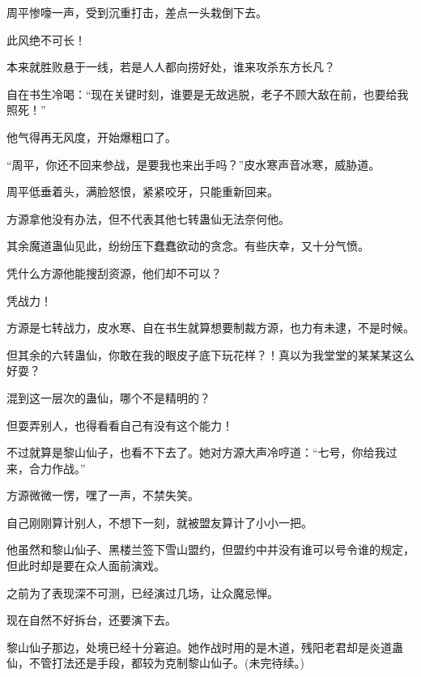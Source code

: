 \begin{this_body}
周平惨嚎一声，受到沉重打击，差点一头栽倒下去。

此风绝不可长！

本来就胜败悬于一线，若是人人都向捞好处，谁来攻杀东方长凡？

自在书生冷喝：“现在关键时刻，谁要是无故逃脱，老子不顾大敌在前，也要给我照死！”

他气得再无风度，开始爆粗口了。

“周平，你还不回来参战，是要我也来出手吗？”皮水寒声音冰寒，威胁道。

周平低垂着头，满脸怒恨，紧紧咬牙，只能重新回来。

方源拿他没有办法，但不代表其他七转蛊仙无法奈何他。

其余魔道蛊仙见此，纷纷压下蠢蠢欲动的贪念。有些庆幸，又十分气愤。

凭什么方源他能搜刮资源，他们却不可以？

凭战力！

方源是七转战力，皮水寒、自在书生就算想要制裁方源，也力有未逮，不是时候。

但其余的六转蛊仙，你敢在我的眼皮子底下玩花样？！真以为我堂堂的某某某这么好耍？

混到这一层次的蛊仙，哪个不是精明的？

但耍弄别人，也得看看自己有没有这个能力！

不过就算是黎山仙子，也看不下去了。她对方源大声冷哼道：“七号，你给我过来，合力作战。”

方源微微一愣，嘿了一声，不禁失笑。

自己刚刚算计别人，不想下一刻，就被盟友算计了小小一把。

他虽然和黎山仙子、黑楼兰签下雪山盟约，但盟约中并没有谁可以号令谁的规定，但此时却是要在众人面前演戏。

之前为了表现深不可测，已经演过几场，让众魔忌惮。

现在自然不好拆台，还要演下去。

黎山仙子那边，处境已经十分窘迫。她作战时用的是木道，残阳老君却是炎道蛊仙，不管打法还是手段，都较为克制黎山仙子。(未完待续。)

\end{this_body}

